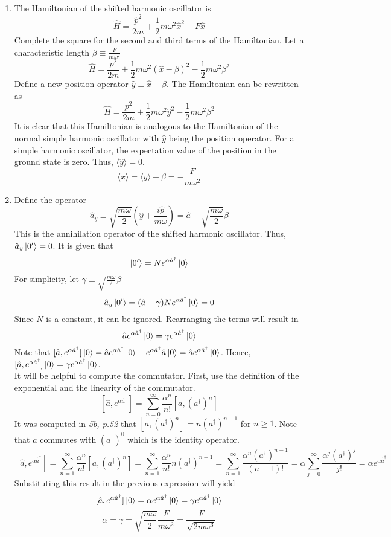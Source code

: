 \begin{sol}
\begin{enumerate}[label=\textbf{(\alph*)}]
\item
The Hamiltonian of the shifted harmonic oscillator is 
$$\hat H=\frac{\hat p^2}{2m}+\frac{1}{2}m\omega^2\hat x^2-F\hat x$$
Complete the square for the second and third terms of the Hamiltonian. Let a characteristic length $\beta\equiv\frac{F}{m\omega^2}$
$$\hat H=\frac{p^2}{2m}+\frac{1}{2}m\omega^2(\hat x-\beta)^2-\frac{1}{2}m\omega^2\beta^2$$
Define a new position operator $\hat y\equiv \hat x-\beta$. The Hamiltonian can be rewritten as
$$\hat H=\frac{p^2}{2m}+\frac{1}{2}m\omega^2\hat y^2-\frac{1}{2}m\omega^2\beta^2$$
It is clear that this Hamiltonian is analogous to the Hamiltonian of the normal simple harmonic oscillator with $\hat y$ being the position operator. For a simple harmonic oscillator, the expectation value of the position in the ground state is zero. Thus, $\langle\hat y\rangle=0$. 
$$\langle x\rangle=\langle y\rangle-\beta=-\frac{F}{m\omega^2}$$
\item
Define the operator
$$\hat a_y\equiv\sqrt{\frac{m\omega}{2}}\left(\hat y+\frac{i\hat p}{m\omega}\right)=\hat a-\sqrt{\frac{m\omega}{2}}\beta$$
This is the annihilation operator of the shifted harmonic oscillator. Thus, $\hat a_y\ket {0'}=0$.
It is given that 
$$\ket{0'}=Ne^{\alpha \hat a^\dagger}\ket 0$$
For simplicity, let $\gamma\equiv\sqrt{\frac{m\omega}{2}}\beta$ 
$$\hat a_y\ket{0'}=(\hat a-\gamma)Ne^{\alpha \hat a^\dagger}\ket 0=0$$ 
Since $N$ is a constant, it can be ignored. Rearranging the terms will result in
$$\hat ae^{\alpha\hat a^\dagger}\ket 0=\gamma e^{\alpha\hat a^\dagger}\ket 0$$
Note that $[\hat a,e^{\alpha\hat a^\dagger}]\ket 0=\hat ae^{\alpha\hat a^\dagger}\ket 0+e^{\alpha\hat a^\dagger}\hat a\ket 0=\hat ae^{\alpha\hat a^\dagger}\ket 0$. Hence, $[\hat a,e^{\alpha\hat a^\dagger}]\ket 0=\gamma e^{\alpha\hat a^\dagger}\ket 0$.\\
It will be helpful to compute the commutator. First, use the definition of the exponential and the linearity of the commutator.
$$[\hat a,e^{\alpha\hat a^\dagger}]=\sum_{n=0}^\infty\frac{\alpha^n}{n!}[a,(a^\dagger)^n]$$
It was computed in \textit{5b, p.52} that $[a,(a^\dagger)^n]=n(a^\dagger)^{n-1}$ for $n\geq 1$. Note that $a$ commutes with $(a^\dagger)^0$ which is the identity operator.
$$[\hat a,e^{\alpha\hat a^\dagger}]=\sum_{n=1}^\infty\frac{\alpha^n}{n!}[a,(a^\dagger)^n]=\sum_{n=1}^\infty\frac{\alpha^n}{n!}n(a^\dagger)^{n-1}=\sum_{n=1}^\infty\frac{\alpha^n(a^\dagger)^{n-1}}{(n-1)!}=\alpha\sum_{j=0}^\infty\frac{\alpha^j(a^\dagger)^{j}}{j!}=\alpha e^{\alpha \hat a^\dagger}$$ 
Substituting this result in the previous expression will yield
$$[\hat a,e^{\alpha\hat a^\dagger}]\ket 0=\alpha e^{\alpha\hat a^\dagger}\ket 0=\gamma e^{\alpha\hat a^\dagger}\ket 0$$
$$\alpha=\gamma=\sqrt{\frac{m\omega}{2}}\frac{F}{m\omega^2}=\frac{F}{\sqrt{2m\omega^3}}$$ 

\end{enumerate}
\end{sol}